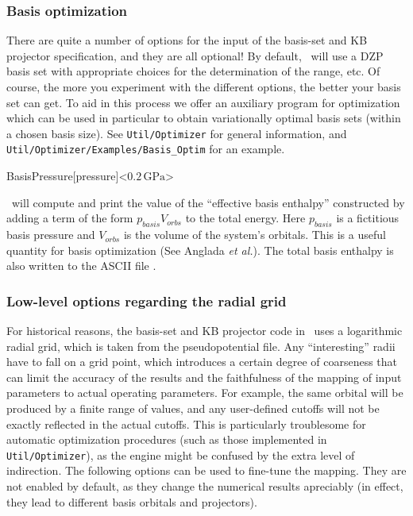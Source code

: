 \subsubsection{Basis optimization}

There are quite a number of options for the input of the basis-set and
KB projector specification, and they are all optional! By default,
\siesta\ will use a DZP basis set with appropriate choices for the
determination of the range, etc. Of course, the more you experiment
with the different options, the better your basis set can get. To aid
in this process we offer an auxiliary program for optimization which
can be used in particular to obtain variationally optimal basis sets
(within a chosen basis size). See \texttt{Util/Optimizer}
for general information, and \texttt{Util/Optimizer/Examples/Basis\_Optim}
for an example.

\begin{fdfentry}{BasisPressure}[pressure]<$0.2\,\mathrm{GPa}$>

  \siesta\ will compute and print the value of the ``effective basis
  enthalpy'' constructed by adding a term of the form
  $p_{basis}V_{orbs}$ to the total energy. Here $p_{basis}$ is a
  fictitious basis pressure and $V_{orbs}$ is the volume of the
  system's orbitals. This is a useful quantity for basis optimization
  (See Anglada \emph{et al.\/}). The total basis enthalpy is also
  written to the ASCII file .
  
\end{fdfentry}



\subsubsection{Low-level options regarding the radial grid}

For historical reasons, the basis-set and KB projector code in
\siesta\ uses a logarithmic radial grid, which is taken from the
pseudopotential file. Any ``interesting'' radii have to fall on a grid
point, which introduces a certain degree of coarseness that can limit
the accuracy of the results and the faithfulness of the mapping of
input parameters to actual operating parameters. For example, the same
orbital will be produced by a finite range of 
values, and any user-defined cutoffs will not be exactly reflected in
the actual cutoffs. This is particularly troublesome for automatic
optimization procedures (such as those implemented in
\texttt{Util/Optimizer}), as the engine might be confused by the extra
level of indirection. The following options can be used to fine-tune
the mapping.  They are not enabled by default, as they change the
numerical results apreciably (in effect, they lead to different basis
orbitals and projectors).

